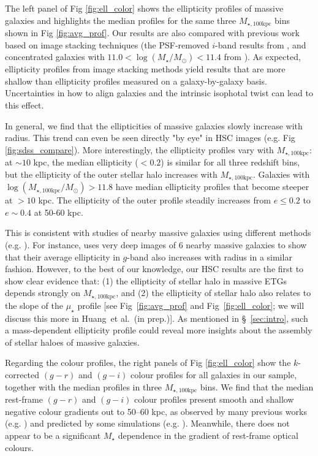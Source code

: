 \documentclass[fleqn,usenatbib]{mnras}
\def\etal{{\ et al.~}}
\def\mstar{{$M_{\star}$}}
\def\logms{{$\log (M_{\star}/M_{\odot})$}}
\def\mtot{{$M_{\star,100\mathrm{kpc}}$}}
\def\logmtot{{$\log (M_{\star,100\mathrm{kpc}}/M_{\odot})$}}
\def\mden{{$\mu_{\star}$}}
\begin{document}
	The left panel of Fig \ref{fig:ell_color} shows the ellipticity profiles of 
	massive galaxies and highlights the median profiles for the same three \mtot{} 
	bins shown in Fig \ref{fig:avg_prof}.  
	Our results are also compared with previous work based on image stacking 
	techniques (the PSF-removed $i$-band results from \citealt{Tal2011}, and
    concentrated galaxies with $11.0<$\logms{}$<11.4$ from \citealt{dSouza2015}).
	As expected, ellipticity profiles from image stacking methods yield results that 
	are more shallow than ellipticity profiles measured on a galaxy-by-galaxy basis.     
	Uncertainties in how to align galaxies and the intrinsic isophotal twist can 
	lead to this effect. 

	In general, we find that the ellipticities of massive galaxies slowly increase 
	with radius. 
	This trend can even be seen directly "by eye" in HSC images (e.g. 
	Fig \ref{fig:sdss_compare}). 
	More interestingly, the ellipticity profiles vary with \mtot{}: 
	at ${\sim} 10$ kpc, the median ellipticity ($< 0.2$) is similar for all three 
	redshift bins, but the ellipticity of the outer stellar halo increases with 
	\mtot{}. 
	Galaxies with \logmtot{}$>11.8$ have median ellipticity profiles that become 
	steeper at $>10$ kpc. 
	The ellipticity of the outer profile steadily increases from 
	$e\le 0.2$ to $e{\sim} 0.4$ at 50-60 kpc.
    
	This is consistent with studies of nearby massive galaxies using different
	methods (e.g. \citep{Porter1991, Gonzalez2005, Zibetti2005, Huang2013a, Oh2017}). 
	For instance, \citet{Spavone2017} uses very deep images of 6 nearby massive 
	galaxies to show that their average ellipticity in $g$-band also increases with 
	radius in a similar fashion.
	However, to the best of our knowledge, our HSC results are the first to show 
	clear evidence that:  
	(1) the ellipticity of stellar halo in massive ETGs depends strongly on 
	\mtot{}, and 
	(2) the ellipticity of stellar halo also relates to the slope of the \mden{}
	profile [see Fig~\ref{fig:avg_prof} and Fig~\ref{fig:ell_color}; 
	we will discuss this more in Huang\etal (in prep.)]. 
	As mentioned in \S~\ref{sec:intro}, such a mass-dependent ellipticity profile
	could reveal more insights about the assembly of stellar haloes of massive
	galaxies. 
    
    Regarding the colour profiles, the right panels of Fig \ref{fig:ell_color} show 
    the $k$-corrected $(g-r)$ and $(g-i)$ colour profiles for all galaxies in our 
    sample, together with the median profiles in three \mtot{} bins. 
    We find that the median rest-frame $(g-r)$ and $(g-i)$ colour profiles present 
    smooth and shallow negative colour gradients out to 50--60 kpc, as observed by 
    many previous works (e.g. \citealt{Carollo1993, LaBarbera2012}) and predicted 
    by some simulations (e.g. \citealt{Hirschmann2015}). 
    Meanwhile, there does not appear to be a significant \mstar{} dependence 
    in the gradient of rest-frame optical colours. 
    
\end{document}
